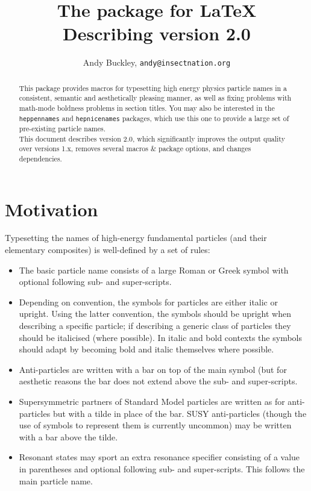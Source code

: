 \documentclass[12pt]{article}
\author{Andy Buckley, \texttt{andy@insectnation.org}}
\title{The \hepparticles package for \LaTeX\\ \smaller[2] Describing \hepparticles version 2.0}
\begin{document}
\maketitle

\begin{abstract}
  This package provides macros for typesetting high energy physics particle
  names in a consistent, semantic and aesthetically pleasing manner, as well as
  fixing problems with math-mode boldness problems in section titles. You may
  also be interested in the \texttt{heppennames} and \texttt{hepnicenames}
  packages, which
  use this one to provide a large set of pre-existing particle names.\\
  This document describes version 2.0, which significantly improves the output
  quality over versions 1.x, removes several macros \& package options, and
  changes dependencies.
\end{abstract}

\section{Motivation}
Typesetting the names of high-energy fundamental particles (and their elementary
composites) is well-defined by a set of rules:

\begin{itemize}
\item The basic particle name consists of a large Roman or Greek symbol with
  optional following sub- and super-scripts.
\item Depending on convention, the symbols for particles are either italic or
  upright. Using the latter convention, the symbols should be upright when
  describing a specific particle; if describing a generic class of particles
  they should be italicised (where possible). In italic and bold contexts the
  symbols should adapt by becoming bold and italic themselves where possible.
\item Anti-particles are written with a bar on top of the main symbol (but for
  aesthetic reasons the bar does not extend above the sub- and super-scripts.
\item Supersymmetric partners of Standard Model particles are written as for
  anti-particles but with a tilde in place of the bar. SUSY anti-particles
  (though the use of symbols to represent them is currently uncommon) may be
  written with a bar above the tilde.
\item Resonant states may sport an extra resonance specifier consisting of a
  value in parentheses and optional following sub- and super-scripts. This
  follows the main particle name.
\end{itemize}
\end{document}
